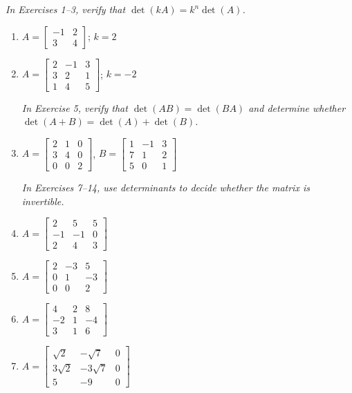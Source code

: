 \documentclass{article}
\theoremstyle{mystyle}
\begin{document}
\noindent\textit{In Exercises 1--3, verify that $\det(kA)=k^n\det(A)$.}

\begin{enumerate}

\item[1.] $A=\begin{bmatrix}-1&2\\3&4\end{bmatrix}$;\; $k=2$

\item[3.] $A=\begin{bmatrix}2&-1&3\\3&2&1\\1&4&5\end{bmatrix}$;\; $k=-2$

\noindent\textit{In Exercise 5, verify that $\det(AB)=\det(BA)$ and determine whether
$\det(A+B)=\det(A)+\det(B)$.}

\item[5.] $A=\begin{bmatrix}2&1&0\\3&4&0\\0&0&2\end{bmatrix}$,\quad
$B=\begin{bmatrix}1&-1&3\\7&1&2\\5&0&1\end{bmatrix}$

\noindent\textit{In Exercises 7--14, use determinants to decide whether the matrix is
invertible.}

\item[7.] $A=\begin{bmatrix}2&5&5\\-1&-1&0\\2&4&3\end{bmatrix}$

\item[9.] $A=\begin{bmatrix}2&-3&5\\0&1&-3\\0&0&2\end{bmatrix}$

\item[11.] $A=\begin{bmatrix}4&2&8\\-2&1&-4\\3&1&6\end{bmatrix}$

\item[14.] $A=\begin{bmatrix}\sqrt{2}&-\sqrt{7}&0\\3\sqrt{2}&-3\sqrt{7}&0\\5&-9&0\end{bmatrix}$


\end{enumerate}
\end{document}
